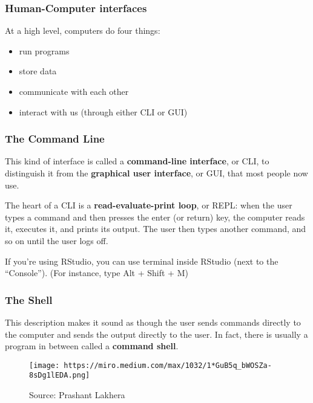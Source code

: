 \documentclass[
]{book}
\providecommand{\tightlist}{%
  \setlength{\itemsep}{0pt}\setlength{\parskip}{0pt}}
\begin{document}
\hypertarget{human-computer-interfaces}{%
\subsubsection{Human-Computer interfaces}\label{human-computer-interfaces}}

At a high level, computers do four things:

\begin{itemize}
\tightlist
\item
  run programs
\item
  store data
\item
  communicate with each other
\item
  interact with us (through either CLI or GUI)
\end{itemize}

\hypertarget{the-command-line-1}{%
\subsubsection{The Command Line}\label{the-command-line-1}}

This kind of interface is called a \textbf{command-line interface}, or CLI,
to distinguish it from the \textbf{graphical user interface}, or GUI, that most people now use.

The heart of a CLI is a \textbf{read-evaluate-print loop}, or REPL: when the user types a command and then presses the enter (or return) key, the computer reads it, executes it, and prints its output. The user then types another command, and so on until the user logs off.

If you're using RStudio, you can use terminal inside RStudio (next to the ``Console''). (For instance, type Alt + Shift + M)

\hypertarget{the-shell}{%
\subsubsection{The Shell}\label{the-shell}}

This description makes it sound as though the user sends commands directly to the computer and sends the output directly to the user. In fact, there is usually a program in between called a \textbf{command shell}.

\begin{figure}
\centering
\texttt{[image: https://miro.medium.com/max/1032/1*GuB5q\_bWOSZa-8sDg1lEDA.png]}
\caption{Source: Prashant Lakhera}
\end{figure}
\end{document}
